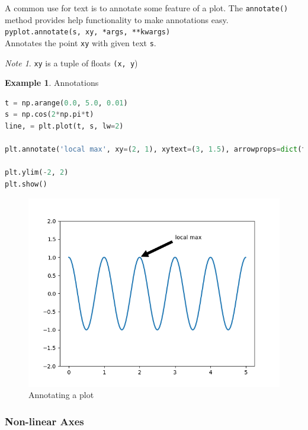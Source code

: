 \documentclass{article}
\theoremstyle{definition}
\newtheorem{ex}{Example}[subsection]
\theoremstyle{remark}
\newtheorem*{nb}{Note}
\newcommand{\func}[2]{\noindent\lstinline{#1}\\#2}
\begin{document}
A common use for text is to annotate some feature of a plot. The \lstinline{annotate()} method provides help functionality to make annotations easy.\\

\func{pyplot.annotate(s, xy, *args, **kwargs)}{Annotates the point \lstinline{xy} with given text \lstinline{s}.}

\begin{nb}
    \lstinline{xy} is a tuple of floats \lstinline{(x, y})
\end{nb}

\begin{ex}Annotations
\begin{lstlisting}[language=Python]
t = np.arange(0.0, 5.0, 0.01)
s = np.cos(2*np.pi*t)
line, = plt.plot(t, s, lw=2)

plt.annotate('local max', xy=(2, 1), xytext=(3, 1.5), arrowprops=dict(facecolor='black', shrink=0.0))

plt.ylim(-2, 2)
plt.show()
\end{lstlisting}

\begin{figure}[h]
    \centering
    \includegraphics[width=\textwidth]{matplotlib_annotating_plots}
    \caption{Annotating a plot}
    \label{fig:mpl_ann}
\end{figure}
\end{ex}

\subsubsection{Non-linear Axes}
\end{document}
